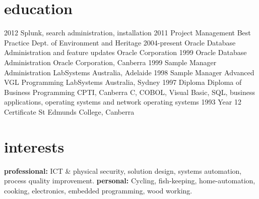 \documentclass[]{friggeri-cv} %
\begin{document}
{\section{education}
\begin{entrylist}
\entry
{2012}
{Splunk, search administration, installation}
{ }
{ }
\entry
{2011}
{Project Management Best Practice}
{Dept. of Environment and Heritage}
{ }
\entry
{2004-present}
{Oracle {\normalfont Database Administration and feature updates}}
{Oracle Corporation}
{ }
\entry
{1999}
{Oracle {\normalfont Database Administration}}
{Oracle Corporation, Canberra}
{ }
\entry
{1999}
{Sample Manager {\normalfont Administration}}
{LabSystems Australia, Adelaide}
{ }
\entry
{1998}
{Sample Manager {\normalfont Advanced VGL Programming}}
{LabSystems Australia, Sydney}
{ }
\entry
{1997}
{Diploma {\normalfont Diploma of Business Programming}}
{CPTI, Canberra}
{C, COBOL, Visual Basic, SQL, business applications, operating systems and network operating systems}
\entry
{1993}
{Year 12 Certificate}
{St Edmunds College, Canberra}
{ }
\end{entrylist}



\section{interests}

\textbf{professional:} ICT \& physical security, solution design, systems automation, process quality improvement.
\textbf{personal:} Cycling, fish-keeping, home-automation, cooking, electronics, embedded programming, wood working.

} %
\end{document}

